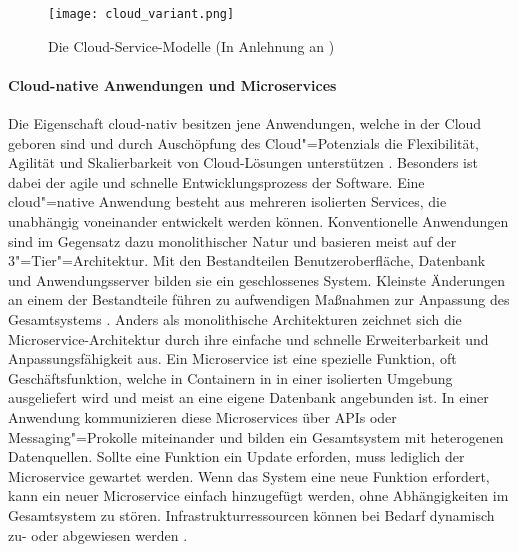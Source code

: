 \begin{figure}[h]
  \centering
  \texttt{[image: cloud\_variant.png]}
  \caption[Die Cloud-Service-Modelle]{Die Cloud-Service-Modelle (In Anlehnung an \citet[S. 88]{Utecht2018})}
  \label{}
\end{figure}

\paragraph{Cloud-native Anwendungen und Microservices}

Die Eigenschaft cloud-nativ besitzen jene Anwendungen, welche in der Cloud \glqq geboren\grqq{} sind und durch Auschöpfung des Cloud"=Potenzials die Flexibilität, Agilität und Skalierbarkeit von Cloud-Lösungen unterstützen \citep{Acharya2019}. Besonders ist dabei der agile und schnelle Entwicklungsprozess der Software. Eine cloud"=native Anwendung besteht aus mehreren isolierten Services, die unabhängig voneinander entwickelt werden können. Konventionelle Anwendungen sind im Gegensatz dazu monolithischer Natur und basieren meist auf der 3"=Tier"=Architektur. Mit den Bestandteilen Benutzeroberfläche, Datenbank und Anwendungsserver bilden sie ein geschlossenes System. Kleinste Änderungen an einem der Bestandteile führen zu aufwendigen Maßnahmen zur Anpassung des Gesamtsystems \citep{Utecht2018}.
Anders als monolithische Architekturen zeichnet sich die Microservice-Architektur durch ihre einfache und schnelle Erweiterbarkeit und Anpassungsfähigkeit aus. Ein Microservice ist eine spezielle Funktion, oft Geschäftsfunktion, welche in Containern in in einer isolierten Umgebung ausgeliefert wird und meist an eine eigene Datenbank angebunden ist. In einer Anwendung kommunizieren diese Microservices über APIs oder Messaging"=Prokolle miteinander und bilden ein Gesamtsystem mit heterogenen Datenquellen. Sollte eine Funktion ein Update erforden, muss lediglich der Microservice  gewartet werden. Wenn das System eine neue Funktion erfordert, kann ein neuer Microservice einfach hinzugefügt werden, ohne Abhängigkeiten im Gesamtsystem zu stören. Infrastrukturressourcen können bei Bedarf dynamisch zu- oder abgewiesen werden \citep{Acharya2019}.


